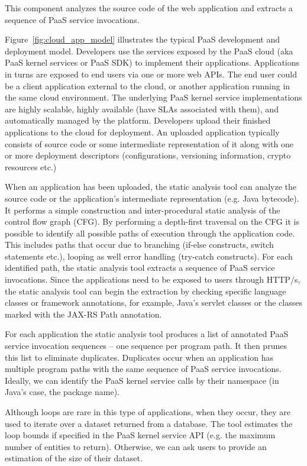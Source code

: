 \documentclass[11pt]{article}
\begin{document}
This component analyzes the source code of the web application and extracts a sequence of PaaS service invocations.

Figure~\ref{fig:cloud_app_model} illustrates the typical PaaS development and deployment model. 
Developers use the services exposed by the
PaaS cloud (aka PaaS kernel services or PaaS SDK) to implement their applications. Applications
in turns are exposed to end users via one or more web APIs. The end user could be a client application
external to the cloud, or another application running in the same cloud environment. 
The underlying PaaS kernel service implementations are highly scalable, highly available
(have SLAs associated with them), and automatically managed by the platform. 
Developers upload their finished applications to the cloud for deployment. An uploaded
application typically consists of source code or some intermediate representation of it along
with one or more deployment descriptors (configurations, versioning information, crypto resources etc.)

When an application has been uploaded, the static analysis tool can analyze the source code 
or the application's intermediate representation (e.g. Java bytecode). It performs a simple 
construction and inter-procedural static analysis of the control flow graph (CFG).
By performing a depth-first traversal on the CFG it is possible to identify all possible paths
of execution through the application code. This includes paths that occur due to branching (if-else constructs, 
switch statements etc.), looping as well error handling (try-catch constructs). 
For each identified path, the static analysis tool extracts a sequence of PaaS service 
invocations. Since the applications need to be exposed to users through HTTP/s, 
the static analysis tool can begin the extraction by checking specific language classes
or framework annotations, for example, Java's servlet classes or the classes marked with
the JAX-RS Path annotation.

For each application the static analysis tool produces a list of annotated PaaS 
service invocation sequences -- one sequence per program path.
It then prunes this list to eliminate duplicates. Duplicates occur when an application has multiple program
paths with the same sequence of PaaS service invocations.
Ideally, we can identify the PaaS kernel service calls by their namespace 
(in Java's case, the package name).

Although loops are rare in this type of applications, when they occur, they are used to 
iterate over a dataset returned from a database. The tool estimates the loop 
bounds if specified in the PaaS kernel service API (e.g. the maximum number of entities to return). 
Otherwise, we can ask users to provide an estimation of the size of their dataset.
\end{document}
